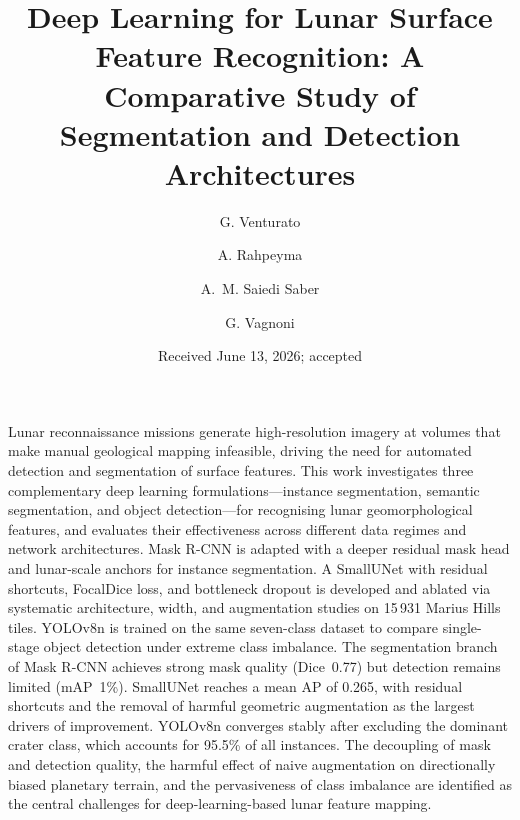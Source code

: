 \documentclass{aa}
\begin{document}
 


   \title{Deep Learning for Lunar Surface Feature Recognition:
          A Comparative Study of Segmentation and Detection Architectures}

   \author{G. Venturato
          \and
          A. Rahpeyma
          \and
          A.~M. Saiedi Saber
          \and
          G. Vagnoni
          }


   \date{Received June 13, 2026; accepted}

 
   \abstract
    {Lunar reconnaissance missions generate high-resolution imagery at volumes that make manual geological mapping infeasible, driving the need for automated detection and segmentation of surface features.}
    {This work investigates three complementary deep learning formulations---instance segmentation, semantic segmentation, and object detection---for recognising lunar geomorphological features, and evaluates their effectiveness across different data regimes and network architectures.}
    {Mask R-CNN is adapted with a deeper residual mask head and lunar-scale anchors for instance segmentation. A SmallUNet with residual shortcuts, FocalDice loss, and bottleneck dropout is developed and ablated via systematic architecture, width, and augmentation studies on 15\,931 Marius Hills tiles. YOLOv8n is trained on the same seven-class dataset to compare single-stage object detection under extreme class imbalance.}
    {The segmentation branch of Mask R-CNN achieves strong mask quality (Dice~0.77) but detection remains limited (mAP~1\%). SmallUNet reaches a mean AP of 0.265, with residual shortcuts and the removal of harmful geometric augmentation as the largest drivers of improvement. YOLOv8n converges stably after excluding the dominant crater class, which accounts for 95.5\% of all instances.}
     {The decoupling of mask and detection quality, the harmful effect of naive augmentation on directionally biased planetary terrain, and the pervasiveness of class imbalance are identified as the central challenges for deep-learning-based lunar feature mapping.}
\end{document}
